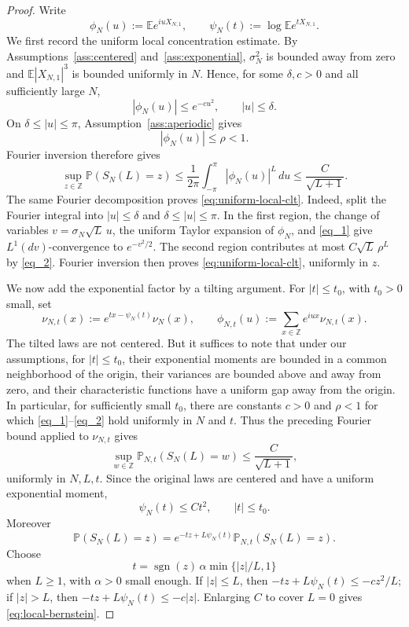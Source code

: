 \documentclass[11pt]{article}
\theoremstyle{plain}
\theoremstyle{definition}
\theoremstyle{remark}
\newcommand{\Z}{\mathbb Z}
\newcommand{\Pp}{\mathbb P}
\newcommand{\Ee}{\mathbb E}
\begin{document}
\begin{proof}
Write
\[
 \phi_N(u):=\Ee e^{iuX_{N,1}},
 \qquad
 \psi_N(t):=\log\Ee e^{tX_{N,1}} .
\]
We first record the uniform local concentration estimate. By
Assumptions~\ref{ass:centered} and~\ref{ass:exponential},
\(\sigma_N^2\) is bounded away from zero and
\(\Ee |X_{N,1}|^3\) is bounded uniformly in \(N\). Hence, for some
\(\delta,c>0\) and all sufficiently large \(N\),
\begin{equation}\label{eq_1}
 |\phi_N(u)|\le e^{-cu^2},\qquad |u|\le\delta .
\end{equation}
On \(\delta\le |u|\le\pi\), Assumption~\ref{ass:aperiodic} gives
\begin{equation}\label{eq_2}|\phi_N(u)|\le\rho<1.\end{equation}
Fourier inversion therefore gives
\[
 \sup_{z\in\Z}\Pp(S_N(L)=z)
 \le
 \frac1{2\pi}\int_{-\pi}^{\pi}|\phi_N(u)|^L\,du
 \le \frac{C}{\sqrt{L+1}} .
\]
The same Fourier decomposition proves
\eqref{eq:uniform-local-clt}.  Indeed, split the Fourier integral into \(|u|\le\delta\) and
\(\delta\le |u|\le\pi\).  In the first region, the change of variables
\(v=\sigma_N\sqrt L\,u\), the uniform Taylor expansion of \(\phi_N\),
and \eqref{eq_1} give \(L^1(dv)\)-convergence to \(e^{-v^2/2}\).
The second region contributes at most \(C\sqrt L\,\rho^L\) by
\eqref{eq_2}.  Fourier inversion then proves
\eqref{eq:uniform-local-clt}, uniformly in \(z\).

We now add the exponential factor by a tilting argument. For
\(|t|\le t_0\), with \(t_0>0\) small, set
\[
 \nu_{N,t}(x):=e^{tx-\psi_N(t)}\nu_N(x),
 \qquad
 \phi_{N,t}(u):=\sum_{x\in\Z}e^{iux}\nu_{N,t}(x).
\]
The tilted laws are not centered. But it suffices to note that under our assumptions, for $|t|\le t_0$, their exponential moments are bounded in a
common neighborhood of the origin, their variances are bounded above
and away from zero, and their characteristic functions have a uniform
gap away from the origin. In particular,
for sufficiently small \(t_0\), there are constants \(c>0\) and
\(\rho<1\) for which \eqref{eq_1}--\eqref{eq_2} hold uniformly in
\(N\) and \(t\). Thus the preceding Fourier bound
applied to \(\nu_{N,t}\) gives
\[
 \sup_{w\in\Z}\Pp_{N,t}(S_N(L)=w)\le \frac{C}{\sqrt{L+1}},
\]
uniformly in \(N,L,t\). Since the original laws are centered and have a
uniform exponential moment,
\[
 \psi_N(t)\le Ct^2,\qquad |t|\le t_0 .
\]
Moreover
\[
 \Pp(S_N(L)=z)
 =
 e^{-tz+L\psi_N(t)}\Pp_{N,t}(S_N(L)=z).
\]
Choose
\[
 t=\operatorname{sgn}(z)\,\alpha\min\{|z|/L,1\}
\]
when \(L\ge1\), with \(\alpha>0\) small enough. If \(|z|\le L\), then
\(-tz+L\psi_N(t)\le -c z^2/L\); if \(|z|>L\), then
\(-tz+L\psi_N(t)\le -c|z|\). Enlarging \(C\) to cover \(L=0\) gives
\eqref{eq:local-bernstein}.


\end{proof}
\end{document}

